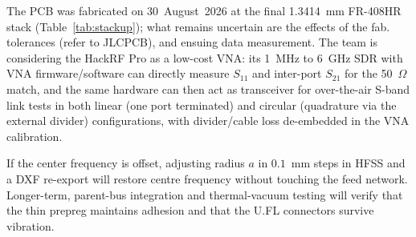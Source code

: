 The PCB was fabricated on 30~August~2026 at the final 1.3414~mm FR-408HR stack (Table~\ref{tab:stackup}); what remains uncertain are the effects of the fab. tolerances (refer to JLCPCB), and ensuing data measurement. The team is considering the HackRF Pro as a low-cost VNA: its 1~MHz to 6~GHz SDR with VNA firmware/software can directly measure $S_{11}$ and inter-port $S_{21}$ for the 50~$\Omega$ match, and the same hardware can then act as transceiver for over-the-air S-band link tests in both linear (one port terminated) and circular (quadrature via the external divider) configurations, with divider/cable loss de-embedded in the VNA calibration.

If the center frequency is offset, adjusting radius $a$ in $0.1$~mm steps in HFSS and a DXF re-export will restore centre frequency without touching the feed network. Longer-term, parent-bus integration and thermal-vacuum testing will verify that the thin prepreg maintains adhesion and that the U.FL connectors survive vibration.

